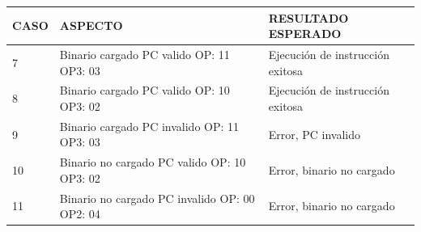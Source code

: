 \documentclass[
  11pt, %
  codirector, %
]{charter}
\begin{document}
\begin{table}[h!]
	\centering
	\begin{tabular}{ | m{2cm} | m{5cm} | m{7cm} | }
		\hline
		\rowcolor{gray!50} %
		\textbf{CASO} & \textbf{ASPECTO} & \textbf{RESULTADO ESPERADO} \\ \hline


    7 & Binario cargado \newline
        PC valido \newline
        OP: 11 \newline
        OP3: 03 \newline
      & Ejecución de instrucción exitosa \\ \hline

    8 & Binario cargado \newline
        PC valido \newline
        OP: 10 \newline
        OP3: 02 \newline
      & Ejecución de instrucción exitosa \\ \hline


    9 & Binario cargado \newline
        PC invalido \newline
        OP: 11 \newline
        OP3: 03 \newline
      & Error, PC invalido \\ \hline

   10 & Binario no cargado \newline
        PC valido \newline
        OP: 10 \newline
        OP3: 02 \newline
      & Error, binario no cargado \\ \hline

   11 & Binario no cargado \newline
        PC invalido \newline
        OP: 00 \newline
        OP2: 04 \newline
      & Error, binario no cargado \\ \hline



	\end{tabular}

\end{table}
\end{document}
